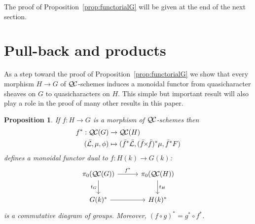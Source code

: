 \documentclass{amsart}
\theoremstyle{plain}
\newtheorem{proposition}[theorem]{Proposition}
\theoremstyle{definition}
\theoremstyle{remark}
\newcommand{\Fq}{k}
\newcommand{\gqcs}[1]{{\mathcal{\bar #1}}}
\newcommand{\QC}{{\mathcal{Q\hskip-0.8pt C}}}
\newcommand{\QCiso}[1]{\pi_0 (\QC(#1))}
\newcommand{\trFrob}[1]{t_{#1}}
\renewcommand{\bf}{\bar{f}}
\newcommand{\tight}[3]{\hspace{-#1pt}{#2}\hspace{-#3pt}}
\newcommand{\bfxf}{\text{$\bar{f} \tight{1}{\times}{1} \bar{f}$}}
\begin{document}
The proof of Proposition~\ref{prop:functorialG} will be given at the end of the next section.

\section{Pull-back and products}\label{sec:pullback}

As a step toward the proof of Proposition~\ref{prop:functorialG} we show that every
morphism  $H \to G$ of $\QC$-schemes induces a monoidal functor from quasicharacter
sheaves on $G$ to quasicharacters on $H$. This simple but important result will also
play a role in the proof of many other results in this paper.

\begin{proposition}\label{prop:pullback}
  If $f : H\to G$ is a morphism of $\QC$-schemes then
  \begin{align*}
  f^* : \QC(G) &\to \QC(H) \\
  (\gqcs{L},\mu,\phi) &\mapsto (\bf^*\gqcs{L},(\bfxf)^*\mu,\bf^*F)
  \end{align*}
  defines a monoidal functor dual to $f \colon H(\Fq) \to G(\Fq)$:
  \[
  \begin{tikzcd}[row sep=20, column sep=30]
   \QCiso{G} \rar{f^*} \arrow[swap]{d}{\trFrob{G}} & \QCiso{H} \dar{\trFrob{H}} \\
   G(\Fq)^* \rar & H(\Fq)^*
  \end{tikzcd}
  \]
  is a commutative diagram of groups.  Moreover, $(f\circ g)^* = g^* \circ f^*$.
\end{proposition}
\end{document}
